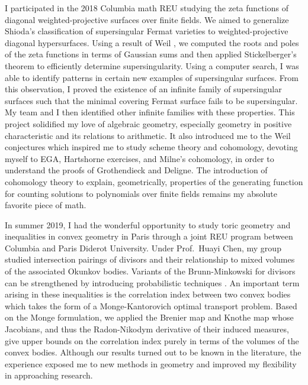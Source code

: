 \documentclass[11pt]{article}
\begin{document}
\par
I participated in the 2018 Columbia math REU studying the zeta functions of diagonal weighted-projective surfaces over finite fields. We aimed to generalize Shioda’s classification of supersingular Fermat varieties  to weighted-projective diagonal hypersurfaces. Using a result of Weil , we computed the roots and poles of the zeta functions in terms of Gaussian sums and then applied Stickelberger's theorem to efficiently determine supersingularity. Using a computer search, I was able to identify patterns in certain new examples of supersingular surfaces. From this observation, I proved the existence of an infinite family of supersingular surfaces such that the minimal covering Fermat surface fails to be supersingular. My team and I then identified other infinite families with these properties. This project solidified my love of algebraic geometry, especially geometry in positive characteristic and its relations to arithmetic. It also introduced me to the Weil conjectures which inspired me to study scheme theory and \etale cohomology, devoting myself to EGA, Hartshorne exercises, and Milne's \etale cohomology, in order to understand the proofs of Grothendieck and Deligne. The introduction of \etale cohomology theory to explain, geometrically, properties of the generating function for counting solutions to polynomials over finite fields remains my absolute favorite piece of math. 
\par
In summer 2019, I had the wonderful opportunity to study toric geometry and inequalities in convex geometry in Paris through a joint REU program between Columbia and Paris Diderot University. Under Prof.\ Huayi Chen, my group studied intersection pairings of divisors and their relationship to mixed volumes of the associated Okunkov bodies. Variants of the Brunn-Minkowski for divisors can be strengthened by introducing probabilistic techniques .
An important term arising in these inequalities is the correlation index between two convex bodies which takes the form of a Monge-Kantorovich optimal transport problem. Based on the Monge formulation, we applied the Brenier map and Knothe map whose Jacobians, and thus the Radon-Nikodym derivative of their induced measures, give upper bounds on the correlation index purely in terms of the volumes of the convex bodies. Although our results turned out to be known in the literature, the experience exposed me to new methods in geometry and improved my flexibility in approaching research.
\end{document}
